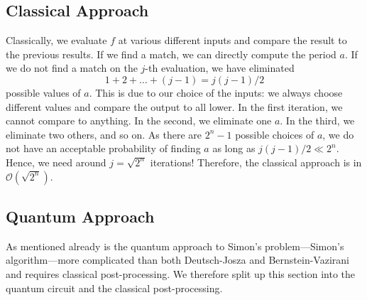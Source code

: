 		\subsection{Classical Approach}
			Classically, we evaluate \(f\) at various different inputs and compare the result to the previous results. If we find a match, we can directly compute the period \(a\). If we do not find a match on the \(j\)-th evaluation, we have eliminated
			\begin{equation}
				1 + 2 + \dots + (j - 1) = j (j - 1) / 2
			\end{equation}
			possible values of \(a\). This is due to our choice of the inputs: we always choose different values and compare the output to all lower. In the first iteration, we cannot compare to anything. In the second, we eliminate one \(a\). In the third, we eliminate two others, and so on. As there are \( 2^n - 1 \) possible choices of \(a\), we do not have an acceptable probability of finding \(a\) as long as \( j (j - 1) / 2 \ll 2^n \). Hence, we need around \( j = \sqrt{2^n} \) iterations! Therefore, the classical approach is in \( \mathcal{O}(\sqrt{2^n}) \).


		\subsection{Quantum Approach}
			As mentioned already is the quantum approach to Simon's problem---Simon's algorithm---more complicated than both Deutsch-Josza and Bernstein-Vazirani and requires classical post-processing. We therefore split up this section into the quantum circuit and the classical post-processing.

